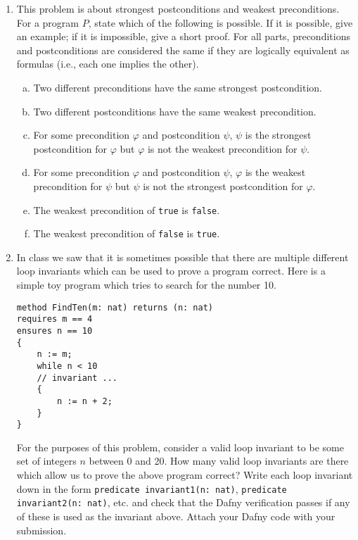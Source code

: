 \documentclass{article}
\begin{document}
\begin{enumerate}
\begin{enumerate}
\end{enumerate}

\item
This problem is about strongest postconditions and weakest preconditions.
For a program $P$, state which of the following is possible.
If it is possible, give an example;
if it is impossible, give a short proof.
For all parts, preconditions and postconditions are considered the same if they are
logically equivalent as formulas (i.e., each one implies the other).

\begin{enumerate}[(a)]
\item
Two different preconditions have the same strongest postcondition.
\item
Two different postconditions have the same weakest precondition.
\item For some precondition $\varphi$ and postcondition $\psi$, $\psi$ is the strongest postcondition for $\varphi$ but $\varphi$ is not the weakest precondition for $\psi$.
\item For some precondition $\varphi$ and postcondition $\psi$,
$\varphi$ is the weakest precondition for $\psi$ but $\psi$ is not the strongest postcondition for $\varphi$.
\item
The weakest precondition of \texttt{true} is \texttt{false}.
\item
The weakest precondition of \texttt{false} is \texttt{true}.
\end{enumerate}

\item
In class we saw that it is sometimes possible that there are multiple different loop invariants
which can be used to prove a program correct.
Here is a simple toy program which tries to search for the number 10.
\begin{verbatim}
method FindTen(m: nat) returns (n: nat)
requires m == 4
ensures n == 10
{
    n := m;
    while n < 10
    // invariant ...
    {
        n := n + 2;
    }
}
\end{verbatim}

For the purposes of this problem, consider a valid loop invariant to be some set of integers
$n$ between 0 and 20.
How many valid loop invariants are there which allow us to prove the above program correct?
Write each loop invariant down in the form \texttt{predicate invariant1(n: nat)}, \texttt{predicate invariant2(n: nat)}, etc. and check that the Dafny verification passes if any of these
is used as the invariant above.
Attach your Dafny code with your submission.


\end{enumerate}
\end{document}
